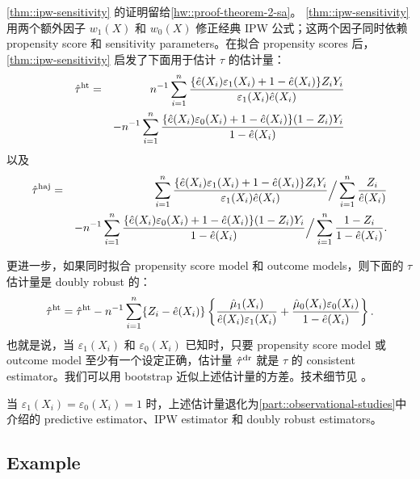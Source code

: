 \cref{thm::ipw-sensitivity} 的证明留给\cref{hw::proof-theorem-2-sa}。
\cref{thm::ipw-sensitivity} 用两个额外因子 $w_1(X) $ 和 $w_0(X) $ 修正经典 IPW 公式；这两个因子同时依赖 propensity score 和 sensitivity parameters。在拟合 propensity scores 后，\cref{thm::ipw-sensitivity} 启发了下面用于估计 $\tau$ 的估计量：
\begin{eqnarray*} 
\hat\tau^{\textup{ht}} &=&  n^{-1} \sum_{i=1}^n \frac{ \{ \hat{e}(X_i)\varepsilon_1(X_i) + 1-\hat{e}(X_i) \} Z_iY_i     }{  \varepsilon_1(X_i)  \hat e(X_i)  } \\
&&- n^{-1} \sum_{i=1}^n  \frac{ \{  \hat e(X_i)  \varepsilon_0(X_i) + 1- \hat e(X_i)  \} (1-Z_i) Y_i }{ 1- \hat e(X_i)} 
\end{eqnarray*}
以及
\begin{eqnarray*} 
\hat\tau^{\textup{haj}} &=&   \sum_{i=1}^n \frac{ \{ \hat{e}(X_i)\varepsilon_1(X_i) + 1-\hat{e}(X_i) \} Z_iY_i     }{  \varepsilon_1(X_i)  \hat  e(X_i)  }  \Big / \sum_{i=1}^n \frac{Z_i}{ \hat{e}(X_i)  }   \\
&&- n^{-1} \sum_{i=1}^n  \frac{ \{  \hat  e(X_i)  \varepsilon_0(X_i) + 1- \hat e(X_i)  \} (1-Z_i) Y_i }{ 1- \hat e(X_i)} \Big / \sum_{i=1}^n \frac{1-Z_i}{ 1- \hat{e}(X_i)  } .
\end{eqnarray*}





更进一步，如果同时拟合 propensity score model 和 outcome models，则下面的 $\tau$ 估计量是 doubly robust 的：
\begin{eqnarray*}
\hat{\tau}^{\textup{ht}} = \hat\tau^{\textup{ht}} 
- n^{-1} \sum_{i=1}^n \{Z_i- \hat e(X_i)\}  \left\{   \frac{  \hat  \mu_1(X_i) }{  \hat e(X_i) \varepsilon_1(X_i)  }    + \frac{  \hat  \mu_0(X_i)\varepsilon_0(X_i)  }{ 1-  \hat  e(X_i) } \right\}.
\end{eqnarray*}
也就是说，当 $\varepsilon_1(X_i) $ 和 $\varepsilon_0(X_i) $ 已知时，只要 propensity score model 或 outcome model 至少有一个设定正确，估计量 $\hat{\tau}^{\textup{dr}} $ 就是 $\tau$ 的 consistent estimator。我们可以用 bootstrap 近似上述估计量的方差。技术细节见 \citet{luding2023flexible}。




当 $\varepsilon_1(X_i)  =  \varepsilon_0(X_i) = 1$ 时，上述估计量退化为\cref{part::observational-studies}中介绍的 predictive estimator、IPW estimator 和 doubly robust estimators。



\subsection{Example}
\label{sec::eg-sensitivity-tau}


